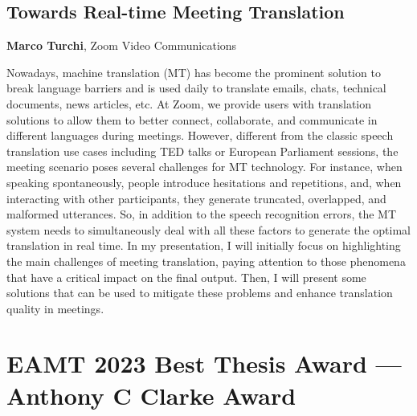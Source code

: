 \documentclass[a4paper,11pt,twoside]{book}
\begin{document}
\section*{Towards Real-time Meeting Translation}\label{invited}
\textbf{Marco Turchi}, Zoom Video Communications
\vspace{0.5cm}

\begin{onehalfspacing}
\noindent
Nowadays, machine translation (MT) has become the prominent solution to break language barriers and is used daily to translate emails, chats, technical documents, news articles, etc. At Zoom, we provide users with translation solutions to allow them to better connect, collaborate, and communicate in different languages during meetings. However, different from the classic speech translation use cases including TED talks or European Parliament sessions, the meeting scenario poses several challenges for MT technology. For instance, when speaking spontaneously, people introduce hesitations and repetitions, and, when interacting with other participants, they generate truncated, overlapped, and malformed utterances. So, in addition to the speech recognition errors, the MT system needs to simultaneously deal with all these factors to generate the optimal translation in real time. In my presentation, I will initially focus on highlighting the main challenges of meeting translation, paying attention to those phenomena that have a critical impact on the final output. Then, I will present some solutions that can be used to mitigate these problems and enhance translation quality in meetings.\\
\end{onehalfspacing}
\vspace{1cm}

\chapter*{EAMT 2023 Best Thesis Award --- Anthony C Clarke Award}
\end{document}
